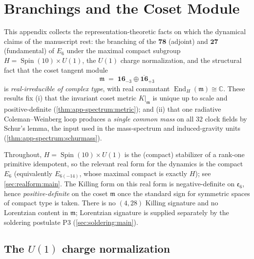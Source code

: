 \documentclass[11pt]{article}
\theoremstyle{plain}
\theoremstyle{definition}
\theoremstyle{remark}
\newcommand{\Spin}{\operatorname{Spin}}
\newcommand{\End}{\operatorname{End}}
\begin{document}
\section{Branchings and the Coset Module}
\label{sec:app-spectrum:main}

This appendix collects the representation-theoretic facts on which the
dynamical claims of the manuscript rest: the branching of the
$\mathbf{78}$ (adjoint) and $\mathbf{27}$ (fundamental) of $E_6$ under
the maximal compact subgroup $H=\Spin(10)\times U(1)$, the
$U(1)$ charge normalization, and the structural fact that the coset
tangent module
\[
  \mathfrak m \;=\; \mathbf{16}_{-3}\oplus\overline{\mathbf{16}}_{+3}
\]
is \emph{real-irreducible of complex type}, with real commutant
$\End_H(\mathfrak m)\cong\mathbb C$.  These results fix (i) that the
invariant coset metric $K|_{\mathfrak m}$ is unique up to scale and
positive-definite (\autoref{thm:app-spectrum:metric}); and (ii) that one
radiative Coleman--Weinberg loop produces a \emph{single common mass} on
all $32$ clock fields by Schur's lemma, the input used in the mass-spectrum
and induced-gravity units (\autoref{thm:app-spectrum:schurmass}).

Throughout, $H=\Spin(10)\times U(1)$ is the (compact) stabilizer of a
rank-one primitive idempotent, so the relevant real form for the dynamics
is the compact $E_6$ (equivalently $E_{6(-14)}$, whose maximal compact is
exactly $H$); see \autoref{sec:realform:main}. The Killing form on this
real form is negative-definite on $\mathfrak e_6$, hence
\emph{positive-definite} on the coset $\mathfrak m$ once the standard
sign for symmetric spaces of compact type is taken. There is no
$(4,28)$ Killing signature and no Lorentzian content in $\mathfrak m$;
Lorentzian signature is supplied separately by the soldering postulate
P3 (\autoref{sec:soldering:main}).

\subsection{The $U(1)$ charge normalization}
\label{sec:app-spectrum:u1}
\end{document}
